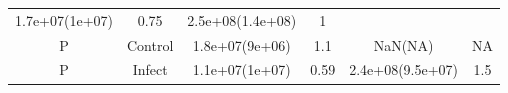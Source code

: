 \documentclass[]{article}
\begin{document}
\begin{longtable}[]{@{}cccccc@{}}
\begin{minipage}[t]{0.15\columnwidth}
1.7e+07(1e+07)\strut
\end{minipage} & \begin{minipage}[t]{0.16\columnwidth}\centering\strut
0.75\strut
\end{minipage} & \begin{minipage}[t]{0.16\columnwidth}\centering\strut
2.5e+08(1.4e+08)\strut
\end{minipage} & \begin{minipage}[t]{0.11\columnwidth}\centering\strut
1\strut
\end{minipage}\tabularnewline
\begin{minipage}[t]{0.12\columnwidth}\centering\strut
P\strut
\end{minipage} & \begin{minipage}[t]{0.11\columnwidth}\centering\strut
Control\strut
\end{minipage} & \begin{minipage}[t]{0.15\columnwidth}\centering\strut
1.8e+07(9e+06)\strut
\end{minipage} & \begin{minipage}[t]{0.16\columnwidth}\centering\strut
1.1\strut
\end{minipage} & \begin{minipage}[t]{0.16\columnwidth}\centering\strut
NaN(NA)\strut
\end{minipage} & \begin{minipage}[t]{0.11\columnwidth}\centering\strut
NA\strut
\end{minipage}\tabularnewline
\begin{minipage}[t]{0.12\columnwidth}\centering\strut
P\strut
\end{minipage} & \begin{minipage}[t]{0.11\columnwidth}\centering\strut
Infect\strut
\end{minipage} & \begin{minipage}[t]{0.15\columnwidth}\centering\strut
1.1e+07(1e+07)\strut
\end{minipage} & \begin{minipage}[t]{0.16\columnwidth}\centering\strut
0.59\strut
\end{minipage} & \begin{minipage}[t]{0.16\columnwidth}\centering\strut
2.4e+08(9.5e+07)\strut
\end{minipage} & \begin{minipage}[t]{0.11\columnwidth}\centering\strut
1.5\strut
\end{minipage}\tabularnewline
\bottomrule
\end{longtable}
\end{document}
